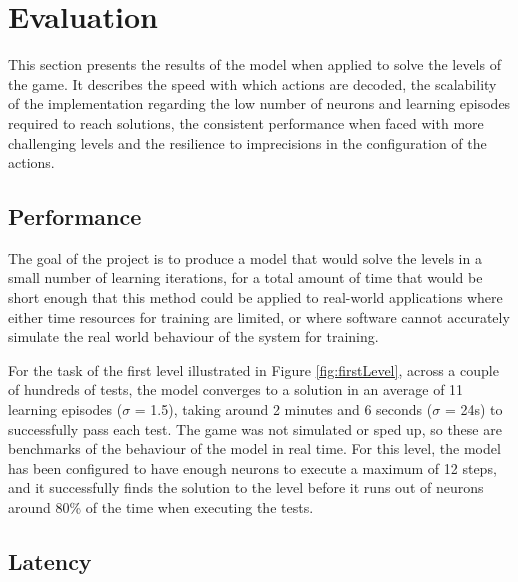 \documentclass[10pt]{article}
\begin{document}
    \section{Evaluation}

    This section presents the results of the model when applied to solve the levels of the game. It describes the speed with which actions are decoded, the scalability of the implementation regarding the low number of neurons and learning episodes required to reach solutions, the consistent performance when faced with more challenging levels and the resilience to imprecisions in the configuration of the actions.

    \subsection{Performance}
    
    The goal of the project is to produce a model that would solve the levels in a small number of learning iterations, for a total amount of time that would be short enough that this method could be applied to real-world applications where either time resources for training are limited, or where software cannot accurately simulate the real world behaviour of the system for training.

    For the task of the first level illustrated in Figure \ref{fig:firstLevel}, across a couple of hundreds of tests, the model converges to a solution in an average of 11 learning episodes ($\sigma$ = 1.5), taking around 2 minutes and 6 seconds ($\sigma$ = 24s) to successfully pass each test. The game was not simulated or sped up, so these are benchmarks of the behaviour of the model in real time. For this level, the model has been configured to have enough neurons to execute a maximum of 12 steps, and it successfully finds the solution to the level before it runs out of neurons around 80\% of the time when executing the tests.

    \subsection{Latency}
\end{document}

